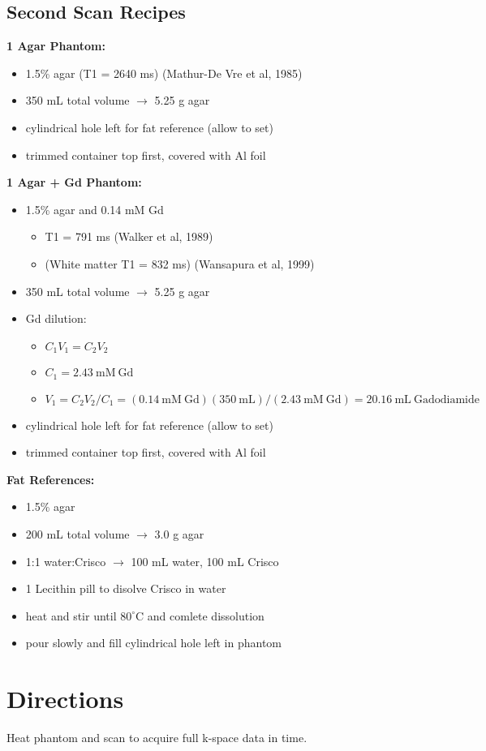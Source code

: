 \documentclass{article}         %
\theoremstyle{definition}
\theoremstyle{remark}
\begin{document}
\subsection{Second Scan Recipes}

\textbf{1 Agar Phantom:}
\begin{itemize}
	\item 1.5\% agar (T1 = 2640 ms) (Mathur-De Vre et al, 1985)
	\item 350 mL total volume $\longrightarrow$ 5.25 g agar
	\item cylindrical hole left for fat reference (allow to set)
	\item trimmed container top first, covered with Al foil
\end{itemize}

\textbf{1 Agar + Gd Phantom:}
\begin{itemize}
	\item 1.5\% agar and 0.14 mM Gd
	\begin{itemize}
		\item T1 = 791 ms (Walker et al, 1989)
		\item (White matter T1 = 832 ms) (Wansapura et al, 1999)
	\end{itemize}
	\item 350 mL total volume $\longrightarrow$ 5.25 g agar
	\item Gd dilution:
	\begin{itemize}
		\item $C_1V_1=C_2V_2$
		\item $C_1 = 2.43 \mathrm{\ mM\ Gd}$
		\item $V_1=C_2V_2/C_1=\left(0.14 \mathrm{\ mM\ Gd}\right)\left(350 \mathrm{\ mL}\right)/\left(2.43 \mathrm{\ mM\ Gd}\right)=20.16 \mathrm{\ mL\ Gadodiamide}$
	\end{itemize}
	\item cylindrical hole left for fat reference (allow to set)
	\item trimmed container top first, covered with Al foil
\end{itemize}

\textbf{Fat References:}
\begin{itemize}
	\item 1.5\% agar
	\item 200 mL total volume $\longrightarrow$ 3.0 g agar
	\item 1:1 water:Crisco $\longrightarrow$ 100 mL water, 100 mL Crisco
	\item 1 Lecithin pill to disolve Crisco in water
	\item heat and stir until $80^\circ \mathrm{C}$ and comlete dissolution
	\item pour slowly and fill cylindrical hole left in phantom
\end{itemize} 

\section{Directions}\label{Directions}

Heat phantom and scan to acquire full k-space data in time.
\end{document}
